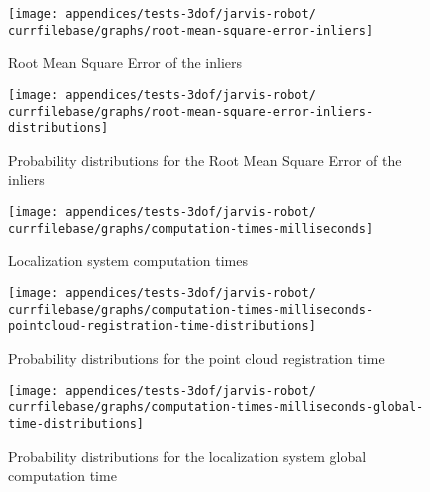 \begin{figure}[H]
	\centering
	\texttt{[image: appendices/tests-3dof/jarvis-robot/\\currfilebase/graphs/root-mean-square-error-inliers]}
	\caption{Root Mean Square Error of the inliers}
\end{figure}

\begin{figure}[H]
	\centering
	\texttt{[image: appendices/tests-3dof/jarvis-robot/\\currfilebase/graphs/root-mean-square-error-inliers-distributions]}
	\caption{Probability distributions for the Root Mean Square Error of the inliers}
\end{figure}


\begin{figure}[H]
	\centering
	\texttt{[image: appendices/tests-3dof/jarvis-robot/\\currfilebase/graphs/computation-times-milliseconds]}
	\caption{Localization system computation times}
\end{figure}

\begin{figure}[H]
	\centering
	\texttt{[image: appendices/tests-3dof/jarvis-robot/\\currfilebase/graphs/computation-times-milliseconds-pointcloud-registration-time-distributions]}
	\caption{Probability distributions for the point cloud registration time}
\end{figure}

\begin{figure}[H]
	\centering
	\texttt{[image: appendices/tests-3dof/jarvis-robot/\\currfilebase/graphs/computation-times-milliseconds-global-time-distributions]}
	\caption{Probability distributions for the localization system global computation time}
\end{figure}
